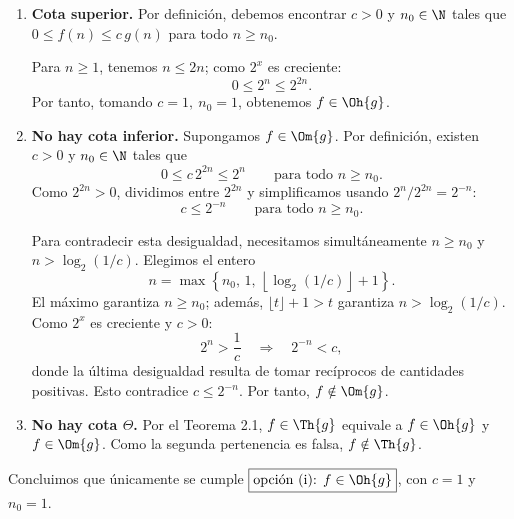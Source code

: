 
\begin{enumerate}
\item \textbf{Cota superior.} Por definición, debemos encontrar $c>0$ y $n_0\in\N$ tales que $0\le f(n)\le c\,g(n)$ para todo $n\ge n_0$.

Para $n\ge1$, tenemos $n\le2n$; como $2^x$ es creciente:
\[
0\le2^n\le2^{2n}.
\]
Por tanto, tomando $\boxed{c=1,\ n_0=1}$, obtenemos $f\in\Oh{g}$.

\item \textbf{No hay cota inferior.} Supongamos $f\in\Om{g}$. Por definición, existen $c>0$ y $n_0\in\N$ tales que
\[
0\le c\,2^{2n}\le2^n\qquad\text{para todo }n\ge n_0.
\]
Como $2^{2n}>0$, dividimos entre $2^{2n}$ y simplificamos usando $2^n/2^{2n}=2^{-n}$:
\[
c\le2^{-n}\qquad\text{para todo }n\ge n_0.
\]

Para contradecir esta desigualdad, necesitamos simultáneamente $n\ge n_0$ y $n>\log_2(1/c)$. Elegimos el entero
\[
n=\max\left\{n_0,\,1,\,\left\lfloor\log_2(1/c)\right\rfloor+1\right\}.
\]
El máximo garantiza $n\ge n_0$; además, $\lfloor t\rfloor+1>t$ garantiza $n>\log_2(1/c)$. Como $2^x$ es creciente y $c>0$:
\[
2^n>\frac1c
\quad\Longrightarrow\quad
2^{-n}<c,
\]
donde la última desigualdad resulta de tomar recíprocos de cantidades positivas. Esto contradice $c\le2^{-n}$. Por tanto, $f\notin\Om{g}$.

\item \textbf{No hay cota $\Theta$.} Por el Teorema 2.1, $f\in\Th{g}$ equivale a $f\in\Oh{g}$ y $f\in\Om{g}$. Como la segunda pertenencia es falsa, $f\notin\Th{g}$.
\end{enumerate}

Concluimos que únicamente se cumple $\boxed{\text{opción (i): }f\in\Oh{g}}$, con $c=1$ y $n_0=1$.
\fin

